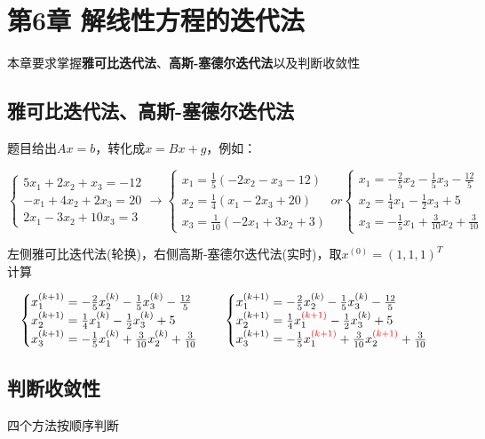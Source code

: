 \section{第6章 \quad 解线性方程的迭代法}

本章要求掌握\textbf{雅可比迭代法}、\textbf{高斯-塞德尔迭代法}以及判断收敛性

\subsection{雅可比迭代法、高斯-塞德尔迭代法}

题目给出$Ax=b$，转化成$x=Bx+g$，例如：

\[
\begin{cases}
5x_1 + 2x_2 + x_3 = -12 \\
-x_1 + 4x_2 + 2x_3 = 20 \\
2x_1 - 3x_2 + 10x_3 = 3
\end{cases}
\xrightarrow{}
\begin{cases}
x_1 = \frac{1}{5} \left(-2x_2 - x_3  -12\right) \\
x_2 = \frac{1}{4} \left(x_1 - 2x_3  +20\right) \\
x_3 = \frac{1}{10} \left(-2x_1 + 3x_2  +3\right)
\end{cases}
or
\begin{cases}
x_1 = -\frac{2}{5}x_2 - \frac{1}{5}x_3  -\frac{12}{5} \\
x_2 = \frac{1}{4}x_1 - \frac{1}{2}x_3  + 5 \\
x_3 = -\frac{1}{5}x_1 + \frac{3}{10}x_2  +\frac{3}{10}
\end{cases}
\]

左侧雅可比迭代法(轮换)，右侧高斯-塞德尔迭代法(实时)，取$x^{(0)}=(1,1,1)^T$计算

\[
\begin{cases}
x_1^{(k+1)} = -\frac{2}{5}x_2^{(k)} - \frac{1}{5}x_3^{(k)}  -\frac{12}{5} \\
x_2^{(k+1)} = \frac{1}{4}x_1^{(k)} - \frac{1}{2}x_3^{(k)}  + 5 \\
x_3^{(k+1)} = -\frac{1}{5}x_1^{(k)} + \frac{3}{10}x_2^{(k)}  +\frac{3}{10}
\end{cases}
\quad
\begin{cases}
x_1^{(k+1)} = -\frac{2}{5}x_2^{(k)} - \frac{1}{5}x_3^{(k)}  -\frac{12}{5} \\
x_2^{(k+1)} = \frac{1}{4}x_1^{\textcolor{red}{(k+1)}} - \frac{1}{2}x_3^{(k)}  + 5 \\
x_3^{(k+1)} = -\frac{1}{5}x_1^{\textcolor{red}{(k+1)}} + \frac{3}{10}x_2^{\textcolor{red}{(k+1)}}  +\frac{3}{10}
\end{cases}
\]

\subsection{判断收敛性}

四个方法按顺序判断

